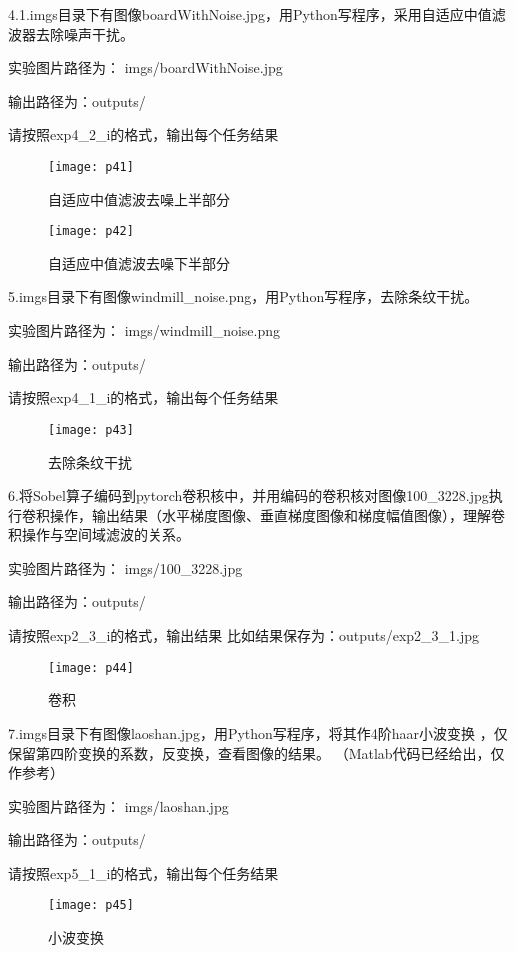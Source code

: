 \documentclass[a4paper ,12pt]{article}
\begin{document}
	 4.1.imgs目录下有图像boardWithNoise.jpg，用Python写程序，采用自适应中值滤波器去除噪声干扰。
	 
	 实验图片路径为：
	 imgs/boardWithNoise.jpg
	 
	 输出路径为：outputs/
	 
	 请按照exp4\_2\_i的格式，输出每个任务结果
	 
	 \begin{figure}[h]
	 	\centering
	 	\texttt{[image: p41]}
	 	\caption{自适应中值滤波去噪上半部分}
	 \end{figure}
	 
	 \begin{figure}[h]
	 	\centering
	 	\texttt{[image: p42]}
	 	\caption{自适应中值滤波去噪下半部分}
	 \end{figure}
	 
	 5.imgs目录下有图像windmill\_noise.png，用Python写程序，去除条纹干扰。
	 
	 实验图片路径为：
	 imgs/windmill\_noise.png
	 
	 输出路径为：outputs/
	 
	 请按照exp4\_1\_i的格式，输出每个任务结果
	 
	 \begin{figure}[h]
		\centering
		\texttt{[image: p43]}
		\caption{去除条纹干扰}
	\end{figure}
	
	6.将Sobel算子编码到pytorch卷积核中，并用编码的卷积核对图像100\_3228.jpg执行卷积操作，输出结果（水平梯度图像、垂直梯度图像和梯度幅值图像），理解卷积操作与空间域滤波的关系。
	
	实验图片路径为：
	imgs/100\_3228.jpg
	
	输出路径为：outputs/
	
	请按照exp2\_3\_i的格式，输出结果
	比如结果保存为：outputs/exp2\_3\_1.jpg
	 \begin{figure}[h]
		\centering
		\texttt{[image: p44]}
		\caption{卷积}
	\end{figure}
	
	7.imgs目录下有图像laoshan.jpg，用Python写程序，将其作4阶haar小波变换 ，仅保留第四阶变换的系数，反变换，查看图像的结果。
	（Matlab代码已经给出，仅作参考）
	
	实验图片路径为：
	imgs/laoshan.jpg
	
	输出路径为：outputs/
	
	请按照exp5\_1\_i的格式，输出每个任务结果
	 \begin{figure}[h]
		\centering
		\texttt{[image: p45]}
		\caption{小波变换}
	\end{figure}
	
\end{document}
